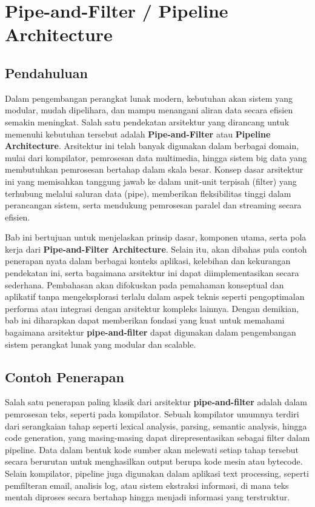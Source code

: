 \chapter{Pipe-and-Filter / Pipeline Architecture}

\section{Pendahuluan}

Dalam pengembangan perangkat lunak modern, kebutuhan akan sistem yang modular, mudah dipelihara, dan mampu menangani aliran data secara efisien semakin meningkat. Salah satu pendekatan arsitektur yang dirancang untuk memenuhi kebutuhan tersebut adalah \textbf{Pipe-and-Filter} atau \textbf{Pipeline Architecture}. Arsitektur ini telah banyak digunakan dalam berbagai domain, mulai dari kompilator, pemrosesan data multimedia, hingga sistem big data yang membutuhkan pemrosesan bertahap dalam skala besar. Konsep dasar arsitektur ini yang memisahkan tanggung jawab ke dalam unit-unit terpisah (filter) yang terhubung melalui saluran data (pipe), memberikan fleksibilitas tinggi dalam perancangan sistem, serta mendukung pemrosesan paralel dan streaming secara efisien.

Bab ini bertujuan untuk menjelaskan prinsip dasar, komponen utama, serta pola kerja dari \textbf{Pipe-and-Filter Architecture}. Selain itu, akan dibahas pula contoh penerapan nyata dalam berbagai konteks aplikasi, kelebihan dan kekurangan pendekatan ini, serta bagaimana arsitektur ini dapat diimplementasikan secara sederhana. Pembahasan akan difokuskan pada pemahaman konseptual dan aplikatif tanpa mengeksplorasi terlalu dalam aspek teknis seperti pengoptimalan performa atau integrasi dengan arsitektur kompleks lainnya. Dengan demikian, bab ini diharapkan dapat memberikan fondasi yang kuat untuk memahami bagaimana arsitektur \textbf{pipe-and-filter} dapat digunakan dalam pengembangan sistem perangkat lunak yang modular dan scalable.


\section{Contoh Penerapan}

Salah satu penerapan paling klasik dari arsitektur \textbf{pipe-and-filter} adalah dalam pemrosesan teks, seperti pada kompilator. Sebuah kompilator umumnya terdiri dari serangkaian tahap seperti lexical analysis, parsing, semantic analysis, hingga code generation, yang masing-masing dapat direpresentasikan sebagai filter dalam pipeline. Data dalam bentuk kode sumber akan melewati setiap tahap tersebut secara berurutan untuk menghasilkan output berupa kode mesin atau bytecode. Selain kompilator, pipeline juga digunakan dalam aplikasi text processing, seperti pemfilteran email, analisis log, atau sistem ekstraksi informasi, di mana teks mentah diproses secara bertahap hingga menjadi informasi yang terstruktur.


